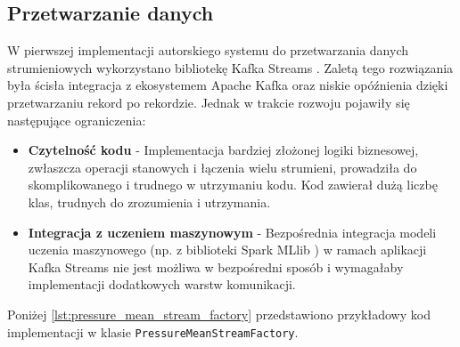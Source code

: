 \subsection{Przetwarzanie danych}

W pierwszej implementacji autorskiego systemu do przetwarzania danych strumieniowych wykorzystano bibliotekę Kafka Streams \cite{kafka_streams}. Zaletą tego rozwiązania była ścisła integracja z ekosystemem Apache Kafka \cite{kafka} oraz niskie opóźnienia dzięki przetwarzaniu rekord po rekordzie. Jednak w trakcie rozwoju pojawiły się następujące ograniczenia:
\begin{itemize}
    \item \textbf{Czytelność kodu} - Implementacja bardziej złożonej logiki biznesowej, zwłaszcza operacji stanowych i łączenia wielu strumieni, prowadziła do skomplikowanego i trudnego w utrzymaniu kodu. Kod zawierał dużą liczbę klas, trudnych do zrozumienia i utrzymania.
    \item \textbf{Integracja z uczeniem maszynowym} - Bezpośrednia integracja modeli uczenia maszynowego (np. z biblioteki Spark MLlib \cite{spark_mllib_reference}) w ramach aplikacji Kafka Streams nie jest możliwa w bezpośredni sposób i wymagałaby implementacji dodatkowych warstw komunikacji.
\end{itemize}

Poniżej \ref{lst:pressure_mean_stream_factory} przedstawiono przykładowy kod implementacji w klasie \texttt{PressureMeanStreamFactory}.

